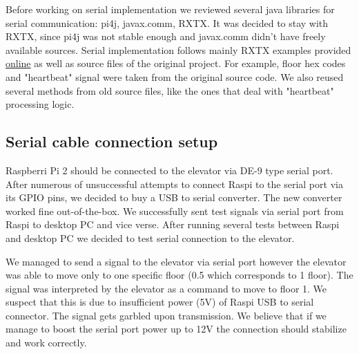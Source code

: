 \documentclass[a4paper, 12pt]{article}
\begin{document}

Before working on serial implementation we reviewed several java libraries for serial communication: pi4j, javax.comm, RXTX.
It was decided to stay with RXTX, since pi4j was not stable enough and javax.comm didn't have freely available sources.
Serial implementation follows mainly RXTX examples provided \href{http://rxtx.qbang.org/wiki/index.php/Two_way_communcation_with_the_serial_port}{online} as well as source files of the original project.
For example, floor hex codes and "heartbeat" signal were taken from the original source code.
We also reused several methods from old source files, like the ones that deal with "heartbeat" processing logic.

\subsection{Serial cable connection setup}
Raspberri Pi 2 should be connected to the elevator via DE-9 type serial port.
After numerous of unsuccessful attempts to connect Raspi to the serial port via its GPIO pins, we decided to buy a USB to serial converter. 
The new converter worked fine out-of-the-box.
We successfully sent test signals via serial port from Raspi to desktop PC and vice verse.
After running several tests between Raspi and desktop PC we decided to test serial connection to the elevator.

We managed to send a signal to the elevator via serial port however the elevator was able to move only to one specific floor (0.5 which corresponds to 1 floor).
The signal was interpreted by the elevator as a command to move to floor 1.
We suspect that this is due to insufficient power (5V) of Raspi USB to serial connector.
The signal gets garbled upon transmission.
We believe that if we manage to boost the serial port power up to 12V the connection should stabilize and work correctly.
\end{document}
